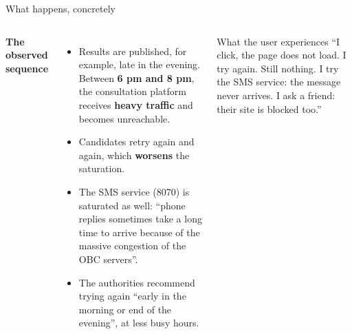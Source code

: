 \documentclass[10pt]{beamer}
\begin{document}
\begin{frame}{What happens, concretely}
  \begin{columns}[T]
    \textbf{The observed sequence}
    \begin{itemize}
      \item Results are published, for example, late in the evening. Between \textbf{6 pm and 8 pm}, the consultation platform receives \textbf{heavy traffic} and becomes unreachable.
      \item Candidates retry again and again, which \textbf{worsens} the saturation.
      \item The SMS service (8070) is saturated as well: ``phone replies sometimes take a long time to arrive because of the massive congestion of the OBC servers''.
      \item The authorities recommend trying again ``early in the morning or end of the evening'', at less busy hours.
    \end{itemize}

    \begin{block}{What the user experiences}
      ``I click, the page does not load. I try again. Still nothing. I try the SMS service: the message never arrives. I ask a friend: their site is blocked too.''
    \end{block}
  \end{columns}
\end{frame}
\end{document}

